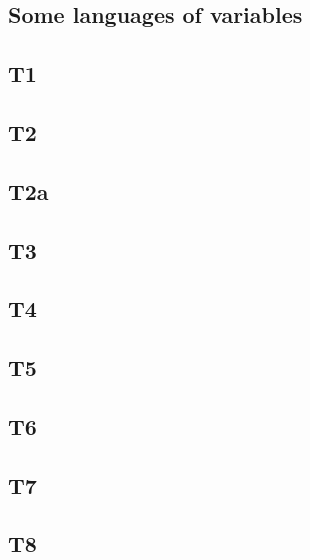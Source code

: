 \documentclass[fleqn]{llncs}
\begin{document}
{\subsection{Some languages of variables}


\subsection{T1}


\subsection{T2}


\subsection{T2a}


\subsection{T3}


\subsection{T4}


\subsection{T5}


\subsection{T6}


\subsection{T7}


\subsection{T8}


}
\end{document}
